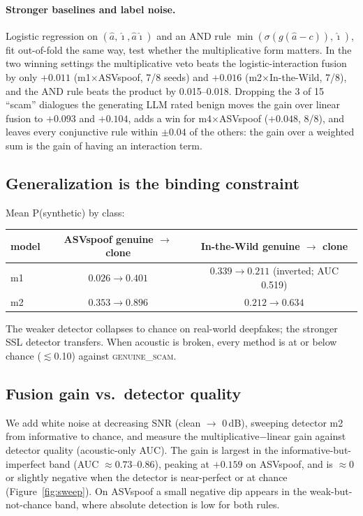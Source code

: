 \documentclass[11pt]{article}
\begin{document}
\paragraph{Stronger baselines and label noise.} Logistic regression on
$(\hat a, \hat\imath, \hat a\hat\imath)$ and an AND rule
$\min(\sigma(g(\hat a-c)), \hat\imath)$, fit out-of-fold the same way, test whether the
multiplicative form matters. In the two winning settings the multiplicative veto beats the
logistic-interaction fusion by only $+0.011$ (m1$\times$ASVspoof, 7/8 seeds) and $+0.016$
(m2$\times$In-the-Wild, 7/8), and the AND rule beats the product by 0.015--0.018. Dropping
the 3 of 15 ``scam'' dialogues the generating LLM rated benign moves the gain over linear
fusion to $+0.093$ and $+0.104$, adds a win for m4$\times$ASVspoof ($+0.048$, 8/8), and
leaves every conjunctive rule within $\pm0.04$ of the others: the gain over a weighted sum
is the gain of having an interaction term.

\subsection{Generalization is the binding constraint}\label{sec:c3}
Mean P(synthetic) by class:
\begin{center}\small
\begin{tabular}{lcc}
\toprule
model & ASVspoof genuine $\to$ clone & In-the-Wild genuine $\to$ clone \\
\midrule
m1 & $0.026 \to 0.401$ & $0.339 \to 0.211$ (inverted; AUC 0.519) \\
m2 & $0.353 \to 0.896$ & $0.212 \to 0.634$ \\
\bottomrule
\end{tabular}
\end{center}
The weaker detector collapses to chance on real-world deepfakes; the stronger SSL detector
transfers. When acoustic is broken, every method is at or below chance ($\lesssim$0.10)
against \textsc{genuine\_scam}.

\subsection{Fusion gain vs.\ detector quality}\label{sec:sweep}
We add white noise at decreasing SNR (clean $\to$ 0\,dB), sweeping detector m2 from
informative to chance, and measure the multiplicative$-$linear gain against detector quality
(acoustic-only AUC). The gain is largest in the informative-but-imperfect band (AUC
$\approx0.73$--$0.86$), peaking at $+0.159$ on ASVspoof, and is $\approx$0 or slightly
negative when the detector is near-perfect or at chance (Figure~\ref{fig:sweep}). On ASVspoof a small negative
dip appears in the weak-but-not-chance band, where absolute detection is low for both rules.
\end{document}
